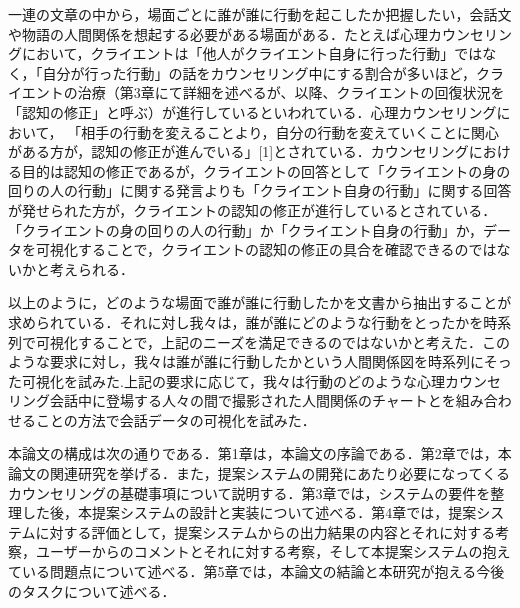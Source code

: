 \documentclass[shuuron]{kuee}
\begin{document}
一連の文章の中から，場面ごとに誰が誰に行動を起こしたか把握したい，会話文や物語の人間関係を想起する必要がある場面がある．たとえば心理カウンセリングにおいて，クライエントは「他人がクライエント自身に行った行動」ではなく，「自分が行った行動」の話をカウンセリング中にする割合が多いほど，クライエントの治療（第3章にて詳細を述べるが、以降、クライエントの回復状況を「認知の修正」と呼ぶ）が進行しているといわれている．心理カウンセリングにおいて， 「相手の行動を変えることより，自分の行動を変えていくことに関心がある方が，認知の修正が進んでいる」[1]とされている．カウンセリングにおける目的は認知の修正であるが，クライエントの回答として「クライエントの身の回りの人の行動」に関する発言よりも「クライエント自身の行動」に関する回答が発せられた方が，クライエントの認知の修正が進行しているとされている．「クライエントの身の回りの人の行動」か「クライエント自身の行動」か，データを可視化することで，クライエントの認知の修正の具合を確認できるのではないかと考えられる．

以上のように，どのような場面で誰が誰に行動したかを文書から抽出することが求められている．それに対し我々は，誰が誰にどのような行動をとったかを時系列で可視化することで，上記のニーズを満足できるのではないかと考えた．このような要求に対し，我々は誰が誰に行動したかという人間関係図を時系列にそった可視化を試みた.上記の要求に応じて，我々は行動のどのような心理カウンセリング会話中に登場する人々の間で撮影された人間関係のチャートとを組み合わせることの方法で会話データの可視化を試みた．

本論文の構成は次の通りである．第1章は，本論文の序論である．第2章では，本論文の関連研究を挙げる．また，提案システムの開発にあたり必要になってくるカウンセリングの基礎事項について説明する．第3章では，システムの要件を整理した後，本提案システムの設計と実装について述べる．第4章では，提案システムに対する評価として，提案システムからの出力結果の内容とそれに対する考察，ユーザーからのコメントとそれに対する考察，そして本提案システムの抱えている問題点について述べる．第5章では，本論文の結論と本研究が抱える今後のタスクについて述べる．

%
\end{document}
